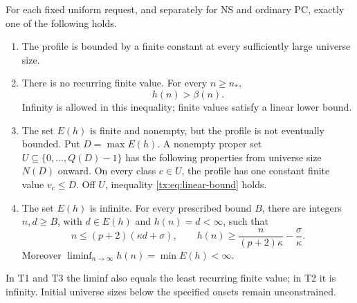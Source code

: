 \begin{theorem}\label{tx:thm:profiles}\label{tx:thm:classification}
For each fixed uniform request, and separately for NS and ordinary PC,
exactly one of the following holds.
\begin{enumerate}[label=\textup{T\arabic*.}]
\item The profile is bounded by a finite constant at every sufficiently
large universe size.
\item There is no recurring finite value. For every $n\ge n_*$,
\begin{equation}\label{tx:eq:linear-bound}
                                  h(n)>\beta(n).
\end{equation}
Infinity is allowed in this inequality; finite values satisfy a linear
lower bound.
\item The set $E(h)$ is finite and nonempty, but the profile is not
eventually bounded. Put $D=\max E(h)$. A nonempty proper set
$U\subseteq\{0,\ldots,Q(D)-1\}$ has the following properties from
universe size $N(D)$ onward. On every class $c\in U$, the profile has one
constant finite value $v_c\le D$. Off $U$, inequality
\eqref{tx:eq:linear-bound} holds.
\item The set $E(h)$ is infinite. For every prescribed bound $B$, there
are integers $n,d\ge B$, with $d\in E(h)$ and $h(n)=d<\infty$, such that
\begin{equation}\label{tx:eq:finite-peaks}
 n\le(p+2)(\kappa d+\sigma),\qquad
 h(n)\ge\frac{n}{(p+2)\kappa}-\frac{\sigma}{\kappa}.
\end{equation}
Moreover $\liminf_{n\to\infty}h(n)=\min E(h)<\infty$.
\end{enumerate}
In T1 and T3 the liminf also equals the least recurring finite value;
in T2 it is infinity. Initial universe sizes below the specified onsets remain
unconstrained.
\end{theorem}
